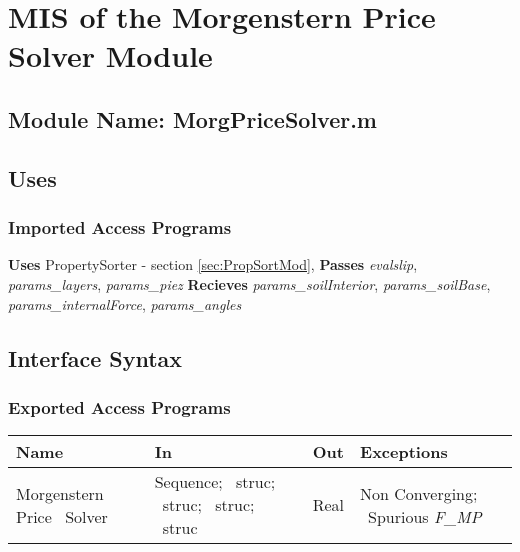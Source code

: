 \documentclass[12pt]{article}
\begin{document}

\section{MIS of the Morgenstern Price Solver Module} \label{sec:MPMod}

\subsection{Module Name: MorgPriceSolver.m}

\subsection{Uses}

\subsubsection{Imported Access Programs}

\noindent
\textbf{Uses} PropertySorter - section \ref{sec:PropSortMod},
\textbf{Passes} \textit{evalslip}, \textit{params\_layers},
\textit{params\_piez} \textbf{Recieves} \textit{params\_soilInterior},
\textit{params\_soilBase}, \textit{params\_internalForce},
\textit{params\_angles}

\subsection{Interface Syntax}

\subsubsection{Exported Access Programs}
\begin{center}
\renewcommand*{\arraystretch}{1.5}
\begin{tabular}{| p{} | p{} | 
p{} | p{} |} \hline 

  \textbf{Name} & \textbf{In} & \textbf{Out} & \textbf{Exceptions}
  \\ \hline

  Morgenstern Price ~\newline Solver & Sequence; ~\newline struc;
  ~\newline struc; ~\newline struc; ~\newline struc & Real & Non
  Converging; ~\newline Spurious \textit{F\_MP} \\ \hline
\end{tabular}
\end{center}
\end{document}
